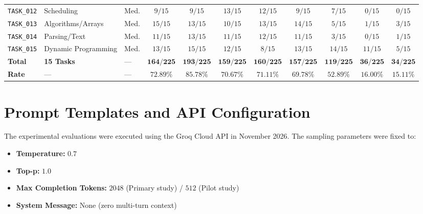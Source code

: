 \documentclass[11pt,a4paper]{article}
\begin{document}
\begin{table}[ht]
{\begin{tabular}{lllcccccccc}
\texttt{TASK\_012} & Scheduling          & Med. & $9/15$  & $9/15$  & $13/15$ & $12/15$ & $9/15$  & $7/15$  & $0/15$  & $0/15$ \\
\texttt{TASK\_013} & Algorithms/Arrays   & Med. & $15/15$ & $13/15$ & $10/15$ & $13/15$ & $14/15$ & $5/15$  & $1/15$  & $3/15$ \\
\texttt{TASK\_014} & Parsing/Text        & Med. & $11/15$ & $13/15$ & $11/15$ & $12/15$ & $11/15$ & $3/15$  & $0/15$  & $1/15$ \\
\texttt{TASK\_015} & Dynamic Programming & Med. & $13/15$ & $15/15$ & $12/15$ & $8/15$  & $13/15$ & $14/15$ & $11/15$ & $5/15$ \\
\midrule
\textbf{Total}     & \textbf{15 Tasks}   & —    & $\mathbf{164/225}$ & $\mathbf{193/225}$ & $\mathbf{159/225}$ & $\mathbf{160/225}$ & $\mathbf{157/225}$ & $\mathbf{119/225}$ & $\mathbf{36/225}$ & $\mathbf{34/225}$ \\
\textbf{Rate}      & —                   & —    & $\mathbf{72.89\%}$ & $\mathbf{85.78\%}$ & $\mathbf{70.67\%}$ & $\mathbf{71.11\%}$ & $\mathbf{69.78\%}$ & $\mathbf{52.89\%}$ & $\mathbf{16.00\%}$ & $\mathbf{15.11\%}$ \\
\bottomrule
\end{tabular}%
}
\end{table}

\section{Prompt Templates and API Configuration}
\label{sec:appendix_prompts}

The experimental evaluations were executed using the Groq Cloud API in November 2026. The sampling parameters were fixed to:
\begin{itemize}
    \item \textbf{Temperature:} $0.7$
    \item \textbf{Top-p:} $1.0$
    \item \textbf{Max Completion Tokens:} $2048$ (Primary study) / $512$ (Pilot study)
    \item \textbf{System Message:} None (zero multi-turn context)
\end{itemize}
\end{document}
